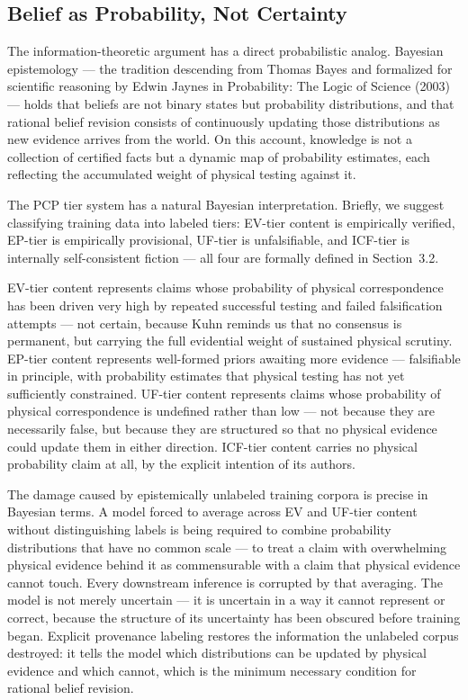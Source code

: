 \documentclass[12pt]{article}
\begin{document}
\subsection{Belief as Probability, Not Certainty}\label{belief-as-probability-not-certainty}

The information-theoretic argument has a direct probabilistic analog.
Bayesian epistemology --- the tradition descending from Thomas Bayes and
formalized for scientific reasoning by Edwin Jaynes in Probability: The
Logic of Science (2003) --- holds that beliefs are not binary states but
probability distributions, and that rational belief revision consists of
continuously updating those distributions as new evidence arrives from
the world. On this account, knowledge is not a collection of certified
facts but a dynamic map of probability estimates, each reflecting the
accumulated weight of physical testing against it.

The PCP tier system has a natural Bayesian interpretation. Briefly, we
suggest classifying training data into labeled tiers: EV-tier content is
empirically verified, EP-tier is empirically provisional, UF-tier is
unfalsifiable, and ICF-tier is internally self-consistent fiction ---
all four are formally defined in Section~3.2.

EV-tier content represents claims whose probability of physical
correspondence has been driven very high by repeated successful testing
and failed falsification attempts --- not certain, because Kuhn reminds
us that no consensus is permanent, but carrying the full evidential
weight of sustained physical scrutiny. EP-tier content represents
well-formed priors awaiting more evidence --- falsifiable in principle,
with probability estimates that physical testing has not yet
sufficiently constrained. UF-tier content represents claims whose
probability of physical correspondence is undefined rather than low ---
not because they are necessarily false, but because they are structured
so that no physical evidence could update them in either direction.
ICF-tier content carries no physical probability claim at all, by the
explicit intention of its authors.

The damage caused by epistemically unlabeled training corpora is precise
in Bayesian terms. A model forced to average across EV and UF-tier
content without distinguishing labels is being required to combine
probability distributions that have no common scale --- to treat a claim
with overwhelming physical evidence behind it as commensurable with a
claim that physical evidence cannot touch. Every downstream inference is
corrupted by that averaging. The model is not merely uncertain --- it is
uncertain in a way it cannot represent or correct, because the structure
of its uncertainty has been obscured before training began. Explicit
provenance labeling restores the information the unlabeled corpus
destroyed: it tells the model which distributions can be updated by
physical evidence and which cannot, which is the minimum necessary
condition for rational belief revision.
\end{document}
